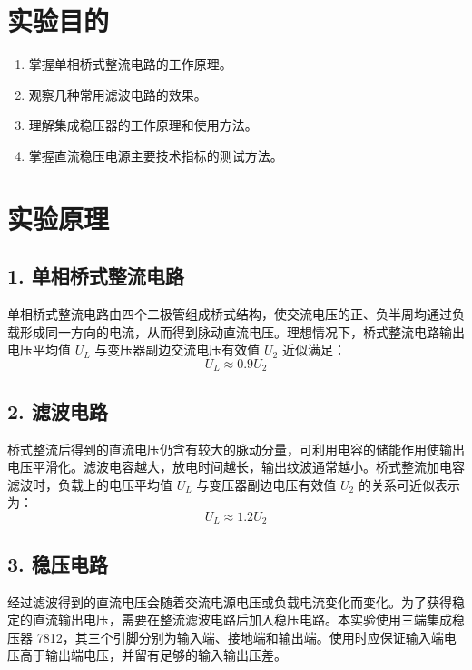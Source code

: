 \documentclass[10.5pt]{config}
\date{5.28} %
\begin{document}
\makeheader %

\section{实验目的}

\begin{enumerate}[label=\arabic*., leftmargin=2em]
    \item 掌握单相桥式整流电路的工作原理。
    \item 观察几种常用滤波电路的效果。
    \item 理解集成稳压器的工作原理和使用方法。
    \item 掌握直流稳压电源主要技术指标的测试方法。
\end{enumerate}

\section{实验原理}

\subsection*{1. 单相桥式整流电路}
单相桥式整流电路由四个二极管组成桥式结构，使交流电压的正、负半周均通过负载形成同一方向的电流，从而得到脉动直流电压。理想情况下，桥式整流电路输出电压平均值 $U_L$ 与变压器副边交流电压有效值 $U_2$ 近似满足：
$$U_L \approx 0.9U_2$$

\subsection*{2. 滤波电路}
桥式整流后得到的直流电压仍含有较大的脉动分量，可利用电容的储能作用使输出电压平滑化。滤波电容越大，放电时间越长，输出纹波通常越小。桥式整流加电容滤波时，负载上的电压平均值 $U_L$ 与变压器副边电压有效值 $U_2$ 的关系可近似表示为：
$$U_L \approx 1.2U_2$$

\subsection*{3. 稳压电路}
经过滤波得到的直流电压会随着交流电源电压或负载电流变化而变化。为了获得稳定的直流输出电压，需要在整流滤波电路后加入稳压电路。本实验使用三端集成稳压器 7812，其三个引脚分别为输入端、接地端和输出端。使用时应保证输入端电压高于输出端电压，并留有足够的输入输出压差。
\end{document}
